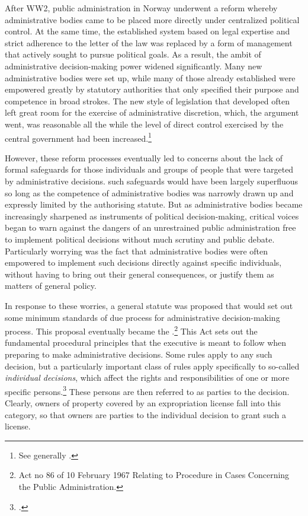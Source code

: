 After WW2, public administration in Norway underwent a reform whereby administrative bodies came to be placed more directly under centralized political control. At the same time, the established system based on legal expertise and strict adherence to the letter of the law was replaced by a form of management that actively sought to pursue political goals. As a result, the ambit of administrative decision-making power widened significantly. Many new administrative bodies were set up, while many of those already established were empowered greatly by statutory authorities that only specified their purpose and competence in broad strokes. The new style of legislation that developed often left great room for the exercise of administrative discretion, which, the argument went, was reasonable all the while the level of direct control exercised by the central government had been increased.\footnote{See generally \cite{grønli04}.}

However, these reform processes eventually led to concerns about the lack of formal safeguards for those individuals and groups of people that were targeted by administrative decisions. such safeguards would have been largely superfluous so long as the competence of administrative bodies was narrowly drawn up and expressly limited by the authorising statute. But as administrative bodies became increasingly sharpened as instruments of political decision-making, critical voices began to warn against the dangers of an unrestrained public administration free to implement political decisions without much scrutiny and public debate. Particularly worrying was the fact that administrative bodies were often empowered to implement such decisions directly against specific individuals, without having to bring out their general consequences, or justify them as matters of general policy.

In response to these worries, a general statute was proposed that would set out some minimum standards of due process for administrative decision-making process. This proposal eventually became the \cite{paa67}.\footnote{Act no 86 of 10 February 1967 Relating to Procedure in Cases Concerning the Public Administration.} This Act sets out the fundamental procedural principles that the executive is meant to follow when preparing to make administrative decisions. Some rules apply to any such decision, but a particularly important class of rules apply specifically to so-called {\it individual decisions}, which affect the rights and responsibilities of one or more specific persons.\footcite[2]{paa67} These persons are then referred to as parties to the decision. Clearly, owners of property covered by an expropriation license fall into this category, so that owners are parties to the individual decision to grant such a license.

